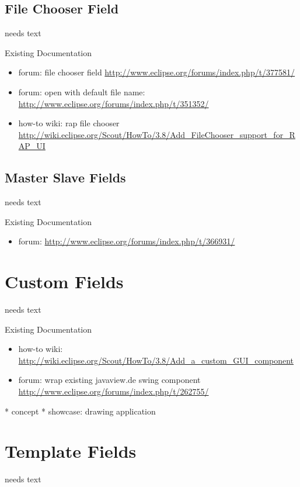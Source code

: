 \documentclass[a4paper,10pt,twoside]{book}
\begin{document}
\section{File Chooser Field}
needs text

\noindent Existing Documentation
\begin{itemize}
  \item forum: file chooser field \url{http://www.eclipse.org/forums/index.php/t/377581/}
  \item forum: open with default file name: \url{http://www.eclipse.org/forums/index.php/t/351352/}
  \item how-to wiki: rap file chooser \url {http://wiki.eclipse.org/Scout/HowTo/3.8/Add_FileChooser_support_for_RAP_UI}
\end{itemize}

\section{Master Slave Fields}
needs text

\noindent Existing Documentation
\begin{itemize}
  \item forum: \url{http://www.eclipse.org/forums/index.php/t/366931/}
\end{itemize}

\chapter{Custom Fields}
needs text

\noindent Existing Documentation
\begin{itemize}
  \item how-to wiki: \url{http://wiki.eclipse.org/Scout/HowTo/3.8/Add_a_custom_GUI_component}
  \item forum: wrap existing javaview.de swing component \url{http://www.eclipse.org/forums/index.php/t/262755/}
\end{itemize}

  * concept
  * showcase: drawing application

\chapter{Template Fields}
needs text
\end{document}

